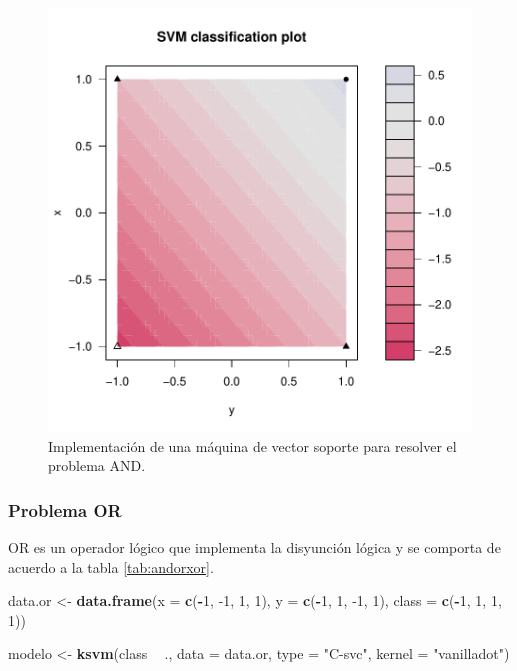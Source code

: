 \documentclass[12pt,spanish,a4paper]{article}
\newenvironment{Shaded}{\begin{snugshade}}{\end{snugshade}}
\newcommand{\DataTypeTok}[1]{\textcolor[rgb]{0.13,0.29,0.53}{#1}}
\newcommand{\DecValTok}[1]{\textcolor[rgb]{0.00,0.00,0.81}{#1}}
\newcommand{\KeywordTok}[1]{\textcolor[rgb]{0.13,0.29,0.53}{\textbf{#1}}}
\newcommand{\NormalTok}[1]{#1}
\newcommand{\OperatorTok}[1]{\textcolor[rgb]{0.81,0.36,0.00}{\textbf{#1}}}
\newcommand{\StringTok}[1]{\textcolor[rgb]{0.31,0.60,0.02}{#1}}
\numberwithin{equation}{section}
\begin{document}
\begin{figure}[h]

{\centering \includegraphics[width=0.65\linewidth]{graphics/svm/and-1} 

}

\caption{Implementación de una máquina de vector soporte para resolver el problema AND.}\label{fig:and}
\end{figure}

\hypertarget{problema-or}{%
\subsubsection{Problema OR}\label{problema-or}}

OR es un operador lógico que implementa la disyunción lógica y se
comporta de acuerdo a la tabla \ref{tab:andorxor}.

\begin{Shaded}
\begin{Highlighting}[]
\NormalTok{data.or <-}\StringTok{ }\KeywordTok{data.frame}\NormalTok{(}\DataTypeTok{x =} \KeywordTok{c}\NormalTok{(}\OperatorTok{-}\DecValTok{1}\NormalTok{, }\DecValTok{-1}\NormalTok{, }\DecValTok{1}\NormalTok{, }\DecValTok{1}\NormalTok{), }
                       \DataTypeTok{y =} \KeywordTok{c}\NormalTok{(}\OperatorTok{-}\DecValTok{1}\NormalTok{, }\DecValTok{1}\NormalTok{, }\DecValTok{-1}\NormalTok{, }\DecValTok{1}\NormalTok{),}
                       \DataTypeTok{class =} \KeywordTok{c}\NormalTok{(}\OperatorTok{-}\DecValTok{1}\NormalTok{, }\DecValTok{1}\NormalTok{, }\DecValTok{1}\NormalTok{, }\DecValTok{1}\NormalTok{))}

\NormalTok{modelo <-}\StringTok{ }\KeywordTok{ksvm}\NormalTok{(class }\OperatorTok{~}\StringTok{ }\NormalTok{., }
               \DataTypeTok{data =}\NormalTok{ data.or, }
               \DataTypeTok{type =} \StringTok{"C-svc"}\NormalTok{, }
               \DataTypeTok{kernel =} \StringTok{"vanilladot"}\NormalTok{)}
\end{Highlighting}
\end{Shaded}
\end{document}
